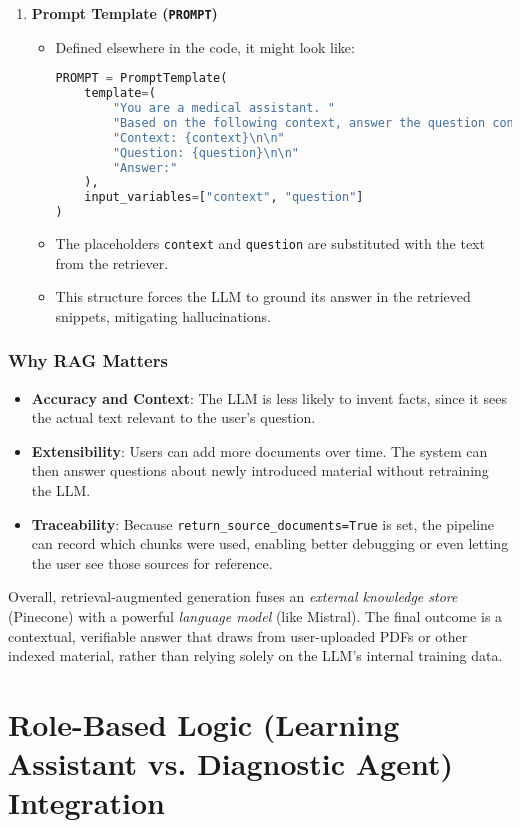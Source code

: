 \begin{enumerate}
    \item \textbf{Prompt Template (\texttt{PROMPT})}
    \begin{itemize}
        \item Defined elsewhere in the code, it might look like:
\begin{lstlisting}[language=Python]
PROMPT = PromptTemplate(
    template=(
        "You are a medical assistant. "
        "Based on the following context, answer the question concisely:\n\n"
        "Context: {context}\n\n"
        "Question: {question}\n\n"
        "Answer:"
    ),
    input_variables=["context", "question"]
)
\end{lstlisting}
        \item The placeholders \texttt{{context}} and \texttt{{question}} are substituted with the text from the retriever. 
        \item This structure forces the LLM to ground its answer in the retrieved snippets, mitigating hallucinations.
    \end{itemize}
\end{enumerate}

\subsubsection*{Why RAG Matters}
\begin{itemize}
    \item \textbf{Accuracy and Context}: The LLM is less likely to invent facts, since it sees the actual text relevant to the user’s question.
    \item \textbf{Extensibility}: Users can add more documents over time. The system can then answer questions about newly introduced material without retraining the LLM.
    \item \textbf{Traceability}: Because \texttt{return\_source\_documents=True} is set, the pipeline can record which chunks were used, enabling better debugging or even letting the user see those sources for reference.
\end{itemize}

\noindent
Overall, retrieval-augmented generation fuses an \textit{external knowledge store} (Pinecone) with a powerful \textit{language model} (like Mistral). The final outcome is a contextual, verifiable answer that draws from user-uploaded PDFs or other indexed material, rather than relying solely on the LLM’s internal training data.

\section{Role-Based Logic (Learning Assistant vs. Diagnostic Agent) Integration}
\label{sec:role-logic}

